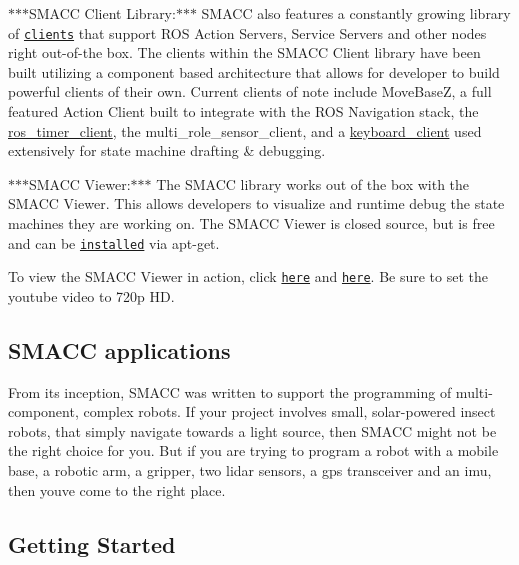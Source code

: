 \begin{DoxyItemize}
\item $\ast$$\ast$$\ast$\+S\+M\+A\+CC Client Library\+:$\ast$$\ast$$\ast$ S\+M\+A\+CC also features a constantly growing library of \href{https://github.com/reelrbtx/SMACC/tree/master/smacc_client_library}{\tt clients} that support R\+OS Action Servers, Service Servers and other nodes right out-\/of-\/the box. The clients within the S\+M\+A\+CC Client library have been built utilizing a component based architecture that allows for developer to build powerful clients of their own. Current clients of note include Move\+BaseZ, a full featured Action Client built to integrate with the R\+OS Navigation stack, the \hyperlink{namespaceros__timer__client}{ros\+\_\+timer\+\_\+client}, the multi\+\_\+role\+\_\+sensor\+\_\+client, and a \hyperlink{namespacekeyboard__client}{keyboard\+\_\+client} used extensively for state machine drafting \& debugging.
\begin{DoxyItemize}
\item $\ast$$\ast$$\ast$\+S\+M\+A\+CC Viewer\+:$\ast$$\ast$$\ast$ The S\+M\+A\+CC library works out of the box with the S\+M\+A\+CC Viewer. This allows developers to visualize and runtime debug the state machines they are working on. The S\+M\+A\+CC Viewer is closed source, but is free and can be \href{http://smacc.ninja/smacc-viewer/}{\tt installed} via apt-\/get.
\end{DoxyItemize}
\end{DoxyItemize}

To view the S\+M\+A\+CC Viewer in action, click \href{https://www.youtube.com/watch?v=WVt4M_teA5I}{\tt here} and \href{https://www.youtube.com/watch?v=fdy37WvC4FQ}{\tt here}. Be sure to set the youtube video to 720p HD.

\subsection*{S\+M\+A\+CC applications}

From it\textquotesingle{}s inception, S\+M\+A\+CC was written to support the programming of multi-\/component, complex robots. If your project involves small, solar-\/powered insect robots, that simply navigate towards a light source, then S\+M\+A\+CC might not be the right choice for you. But if you are trying to program a robot with a mobile base, a robotic arm, a gripper, two lidar sensors, a gps transceiver and an imu, then you\textquotesingle{}ve come to the right place.

 

\subsection*{Getting Started}

